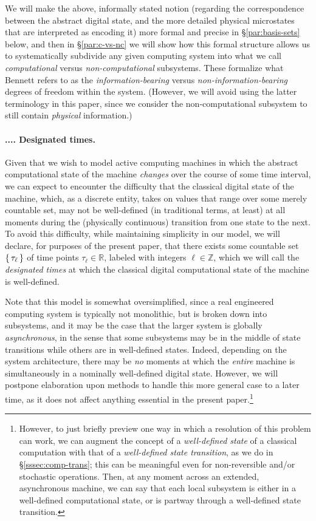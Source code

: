 \documentclass[preprints,article,accept,moreauthors,pdftex]{Definitions/mdpi}
\newcommand{\mypara}[1]{\paragraph{\arabic{section}.\arabic{subsection}.\arabic{subsubsection}.\arabic{paragraph}. #1}}
\begin{document}
We will make the above, informally stated notion (regarding the correspondence between the abstract digital state, and the more detailed physical microstates that are interpreted as encoding it) more formal and precise in \S\ref{par:basis-sets} below, and then in \S\ref{par:c-vs-nc} we will show how this formal structure allows us to systematically subdivide any given computing system into what we call \textit{computational} versus \textit{non-computational} subsystems. These formalize what Bennett \cite{Ben03} refers to as the \textit{information-bearing} versus \textit{non-information-bearing} degrees of freedom within the system. (However, we will avoid using the latter terminology in this paper, since we consider the non-computational subsystem to still contain \textit{physical} information.)

\mypara{Designated times.}\label{par:desig-times}
Given that we wish to model active computing machines in which the abstract computational state of the machine \emph{changes} over the course of some time interval, we can expect to encounter the difficulty that the classical digital state of the machine, which, as a discrete entity, takes on values that range over some merely countable set, may not be well-defined (in traditional terms, at least) at all moments during the (physically continuous) transition from one state to the next. 
To avoid this difficulty, while maintaining  simplicity in our model, we will declare, for purposes of the present paper, that there exists some countable set $\set{\tau_\ell}$ of time points $\tau_\ell\in\mathbb{R}$, labeled with integers $\ell\in\mathbb{Z}$, which we will call the \textit{designated times} at which the classical digital computational state of the machine is well-defined. 

Note that this model is somewhat oversimplified, since a real engineered computing system is typically not monolithic, but is broken down into subsystems, and it may be the case that the larger system is globally \emph{asynchronous}, in the sense that some subsystems may be in the middle of state transitions while others are in well-defined states. Indeed, depending on the system architecture, there may be \emph{no} moments at which the \emph{entire} machine is simultaneously in a nominally well-defined digital state. However, we will postpone elaboration upon methods to handle this more general case to a later time, as it does not affect anything essential in the present paper.\footnote{However, to just briefly preview one way in which a resolution of this problem can work, we can augment the concept of a \emph{well-defined state} of a classical computation with that of a \emph{well-defined state transition}, as we do in \S\ref{sssec:comp-trans}; this can be meaningful even for non-reversible and/or stochastic operations. Then, at any moment across an extended, asynchronous machine, we can say that each local subsystem is either in a well-defined computational state, or is partway through a well-defined state transition.}
\end{document}
